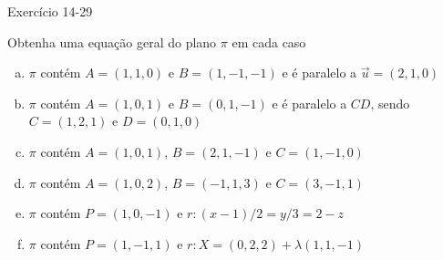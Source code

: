 \begin{frame}{Exercício 14-29}
    \begin{minipage}{\textwidth}
        Obtenha uma equação geral do plano \(\pi\) em cada caso
        \begin{enumerate}[(a)]
            \item \(\pi\) contém \(A=(1,1,0)\) e \(B=(1,-1,-1)\) e é paralelo a \(\vec{u}=(2,1,0)\)
            \item \(\pi\) contém \(A=(1,0,1)\) e \(B=(0,1,-1)\) e é paralelo a \(CD\), sendo
                \(C=(1,2,1)\) e \(D=(0,1,0)\)
            \item \(\pi\) contém \(A=(1,0,1)\), \(B=(2,1,-1)\) e \(C=(1,-1,0)\)
            \item \(\pi\) contém \(A=(1,0,2)\), \(B=(-1,1,3)\) e \(C=(3,-1,1)\)
            \item \(\pi\) contém \(P=(1,0,-1)\) e \(r:(x-1)/2=y/3=2-z\)
            \item \(\pi\) contém \(P=(1,-1,1)\) e \(r:X=(0,2,2)+\lambda (1,1,-1)\)
        \end{enumerate}
    \end{minipage}
\end{frame}

